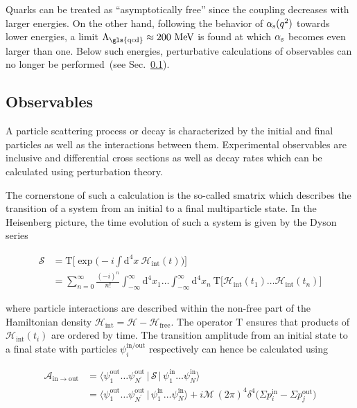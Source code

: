 Quarks can be treated as ``asymptotically free'' since the coupling decreases with larger energies. On the other hand, following the behavior of ${\alpha_\mathrm{s}}(q^2)$ towards lower energies, a limit $\Lambda_\mathrm{\gls{qcd}}\approx 200~\MeV$ is found at which ${\alpha_\mathrm{s}}$ becomes even larger than one. Below such energies, perturbative calculations of observables can no longer be performed~(see Sec.~\ref{sec:theory-observables}). 



\subsection{Observables}
\label{sec:theory-observables}

A particle scattering process or decay is characterized by the initial and final particles as well as the interactions between them. Experimental observables are inclusive and differential cross sections as well as decay rates which can be calculated using perturbation theory. 

The cornerstone of such a calculation is the so-called \gls{smatrix} which describes the transition of a system from an initial to a final multiparticle state. In the Heisenberg picture, the time evolution of such a system is given by the Dyson series

\begin{align}
\mathcal{S}&=\mathrm{T}\Big[\exp\Big(-i\int\mathrm{d}^{4}x~\mathcal{H}_\mathrm{int}(t)\Big)\Big]\\
&=\sum_{n=0}^{\infty}\frac{(-i)^{n}}{n!}\int_{-\infty}^{\infty}\mathrm{d}^{4}x_{1}\ldots \int_{-\infty}^{\infty}\mathrm{d}^{4}x_{n}~\mathrm{T}\Big[\mathcal{H}_\mathrm{int}(t_{1})\ldots\mathcal{H}_\mathrm{int}(t_{n})\Big] \label{eq:theory-dyson-series}
\end{align}

where particle interactions are described within the non-free part of the Hamiltonian density $\mathcal{H}_\mathrm{int}=\mathcal{H}-\mathcal{H}_\mathrm{free}$. The operator $\mathrm{T}$ ensures that products of $\mathcal{H}_\mathrm{int}(t_{i})$ are ordered by time. The transition amplitude from an initial state to a final state with particles $\psi_i^\mathrm{in/out}$ respectively can hence be calculated using

\begin{align}
\mathcal{A}_\mathrm{in\to out}&=\langle\psi_{1}^\mathrm{out}\ldots\psi_{N^{\prime}}^\mathrm{out}\,|\,\mathcal{S}\,|\,\psi_{1}^\mathrm{in}\ldots\psi_{N}^\mathrm{in}\rangle \\
&=\langle\psi_{1}^\mathrm{out}\ldots\psi_{N^{\prime}}^\mathrm{out}\,|\,\psi_{1}^\mathrm{in}\ldots\psi_{N}^\mathrm{in}\rangle+i\mathcal{M}\,(2\pi)^{4}\delta^{4}\big(\Sigma p^\mathrm{in}_{i}-\Sigma p^\mathrm{out}_{j}\big)
\end{align}

